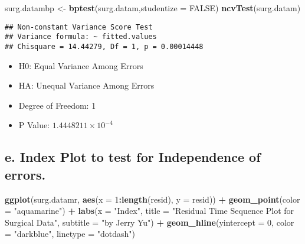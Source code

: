 \documentclass[
]{article}
\newenvironment{Shaded}{\begin{snugshade}}{\end{snugshade}}
\newcommand{\AttributeTok}[1]{\textcolor[rgb]{0.13,0.29,0.53}{#1}}
\newcommand{\ConstantTok}[1]{\textcolor[rgb]{0.56,0.35,0.01}{#1}}
\newcommand{\DecValTok}[1]{\textcolor[rgb]{0.00,0.00,0.81}{#1}}
\newcommand{\FunctionTok}[1]{\textcolor[rgb]{0.13,0.29,0.53}{\textbf{#1}}}
\newcommand{\NormalTok}[1]{#1}
\newcommand{\OtherTok}[1]{\textcolor[rgb]{0.56,0.35,0.01}{#1}}
\newcommand{\SpecialCharTok}[1]{\textcolor[rgb]{0.81,0.36,0.00}{\textbf{#1}}}
\newcommand{\StringTok}[1]{\textcolor[rgb]{0.31,0.60,0.02}{#1}}
\providecommand{\tightlist}{%
  \setlength{\itemsep}{0pt}\setlength{\parskip}{0pt}}
\begin{document}
\begin{Shaded}
\begin{Highlighting}[]
\NormalTok{surg.datambp }\OtherTok{\textless{}{-}} \FunctionTok{bptest}\NormalTok{(surg.datam,}\AttributeTok{studentize =} \ConstantTok{FALSE}\NormalTok{)}
\FunctionTok{ncvTest}\NormalTok{(surg.datam)}
\end{Highlighting}
\end{Shaded}

\begin{verbatim}
## Non-constant Variance Score Test 
## Variance formula: ~ fitted.values 
## Chisquare = 14.44279, Df = 1, p = 0.00014448
\end{verbatim}

\begin{itemize}
\tightlist
\item
  H0: Equal Variance Among Errors
\item
  HA: Unequal Variance Among Errors
\item
  Degree of Freedom: 1
\item
  P Value: \ensuremath{1.4448211\times 10^{-4}}
\end{itemize}

\hypertarget{e.-index-plot-to-test-for-independence-of-errors.-1}{%
\subsection{e. Index Plot to test for Independence of
errors.}\label{e.-index-plot-to-test-for-independence-of-errors.-1}}

\begin{Shaded}
\begin{Highlighting}[]
\FunctionTok{ggplot}\NormalTok{(surg.datamr, }\FunctionTok{aes}\NormalTok{(}\AttributeTok{x =} \DecValTok{1}\SpecialCharTok{:}\FunctionTok{length}\NormalTok{(resid), }\AttributeTok{y =}\NormalTok{ resid)) }\SpecialCharTok{+}
  \FunctionTok{geom\_point}\NormalTok{(}\AttributeTok{color =} \StringTok{"aquamarine"}\NormalTok{) }\SpecialCharTok{+}
  \FunctionTok{labs}\NormalTok{(}\AttributeTok{x =} \StringTok{"Index"}\NormalTok{,}
       \AttributeTok{title =} \StringTok{"Residual Time Sequence Plot for Surgical Data"}\NormalTok{,}
       \AttributeTok{subtitle =} \StringTok{"by Jerry Yu"}\NormalTok{) }\SpecialCharTok{+}
  \FunctionTok{geom\_hline}\NormalTok{(}\AttributeTok{yintercept =} \DecValTok{0}\NormalTok{,}
             \AttributeTok{color =} \StringTok{"darkblue"}\NormalTok{,}
             \AttributeTok{linetype =} \StringTok{"dotdash"}\NormalTok{)}
\end{Highlighting}
\end{Shaded}
\end{document}
